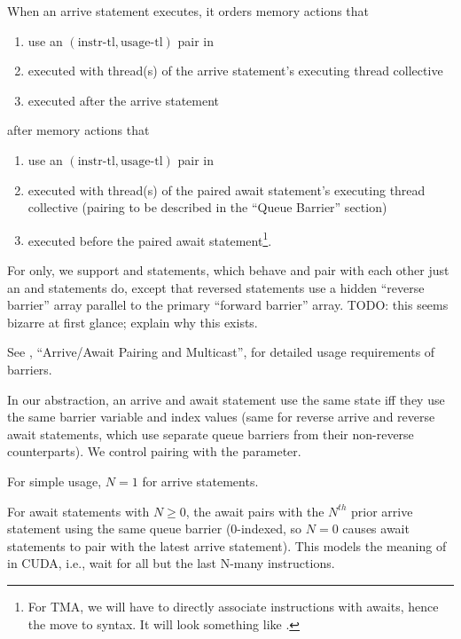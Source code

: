 \filbreak
When an arrive statement executes, it orders memory actions that
\begin{enumerate}
  \item use an $(\text{instr-tl}, \text{usage-tl})$ pair in 
  \item executed with thread(s) of the arrive statement's executing thread collective
  \item executed after the arrive statement
\end{enumerate}
\filbreak
after memory actions that
\begin{enumerate}
  \item use an $(\text{instr-tl}, \text{usage-tl})$ pair in 
  \item executed with thread(s) of the paired await statement's executing thread collective (pairing to be described in the ``Queue Barrier'' section)
  \item executed before the paired await statement\footnote{For TMA, we will have to directly associate instructions with awaits, hence the move to \lighttt{>>} syntax. It will look something like .}.
\end{enumerate}

\filbreak
For  only, we support  and  statements, which behave and pair with each other just an  and  statements do, except that reversed statements use a hidden ``reverse barrier'' array parallel to the primary ``forward barrier'' array.
TODO: this seems bizarre at first glance; explain why this exists.

\filbreak
See , ``Arrive/Await Pairing and Multicast'', for detailed usage requirements of barriers.

\filbreak
{} In our abstraction, an arrive and await statement use the same  state iff they use the same barrier variable and index values (same for reverse arrive and reverse await statements, which use separate queue barriers from their non-reverse counterparts).
We control pairing with the  parameter.

\filbreak
For simple usage, $N = 1$ for arrive statements.

\filbreak
For await statements with $N \ge 0$, the await pairs with the $N^{th}$ prior arrive statement using the same queue barrier
(0-indexed, so $N = 0$ causes await statements to pair with the latest arrive statement).
This models the meaning of  in CUDA, i.e., wait for all but the last N-many  instructions.

